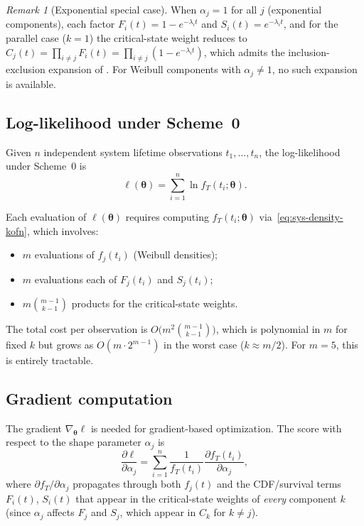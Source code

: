 \documentclass[12pt]{article}
\theoremstyle{definition}
\theoremstyle{remark}
\newtheorem{remark}[theorem]{Remark}
\newcommand{\btheta}{\bm{\theta}}
\begin{document}
\begin{remark}[Exponential special case]
When $\alpha_j = 1$ for all $j$ (exponential components), each
factor $F_i(t) = 1 - e^{-\lambda_i t}$ and
$S_i(t) = e^{-\lambda_i t}$, and for the parallel case ($k = 1$)
the critical-state weight reduces to
$C_j(t) = \prod_{i \neq j} F_i(t) = \prod_{i \neq j}
(1 - e^{-\lambda_i t})$, which admits the inclusion-exclusion
expansion of \citet{Towell2026}.  For Weibull components with
$\alpha_j \neq 1$, no such expansion is available.
\end{remark}

\subsection{Log-likelihood under Scheme~0}

Given $n$ independent system lifetime observations
$t_1, \ldots, t_n$, the log-likelihood under Scheme~0 is
\begin{equation}\label{eq:loglik-scheme0}
  \ell(\btheta) = \sum_{i=1}^n \ln f_T(t_i; \btheta).
\end{equation}

Each evaluation of $\ell(\btheta)$ requires computing
$f_T(t_i; \btheta)$ via~\eqref{eq:sys-density-kofn}, which
involves:
\begin{itemize}
\item $m$ evaluations of $f_j(t_i)$ (Weibull densities);
\item $m$ evaluations each of $F_j(t_i)$ and $S_j(t_i)$;
\item $m \binom{m-1}{k-1}$ products for the critical-state
  weights.
\end{itemize}
The total cost per observation is
$O\bigl(m^2 \binom{m-1}{k-1}\bigr)$, which is polynomial in $m$
for fixed $k$ but grows as $O(m \cdot 2^{m-1})$ in the worst case
($k \approx m/2$).  For $m = 5$, this is entirely tractable.

\subsection{Gradient computation}

The gradient $\nabla_{\btheta} \ell$ is needed for gradient-based
optimization.  The score with respect to the shape parameter
$\alpha_j$ is
\begin{equation}\label{eq:score-alpha}
  \frac{\partial \ell}{\partial \alpha_j}
  = \sum_{i=1}^n \frac{1}{f_T(t_i)}
    \frac{\partial f_T(t_i)}{\partial \alpha_j},
\end{equation}
where $\partial f_T / \partial \alpha_j$ propagates through both
$f_j(t)$ and the CDF/survival terms $F_i(t)$, $S_i(t)$ that appear
in the critical-state weights of \emph{every} component $k$ (since
$\alpha_j$ affects $F_j$ and $S_j$, which appear in $C_k$ for
$k \neq j$).
\end{document}
